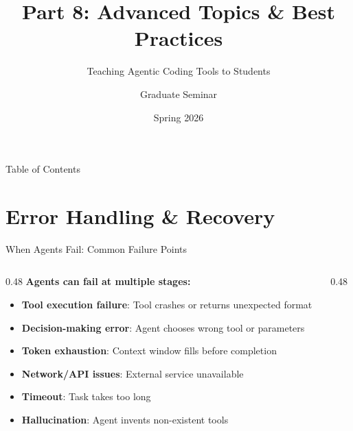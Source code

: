 \documentclass[aspectratio=169,11pt]{beamer}
\title[Part 8: Advanced Topics]{Part 8: Advanced Topics \& Best Practices}
\subtitle{Teaching Agentic Coding Tools to Students}
\author{Graduate Seminar}
\institute{University of South Carolina}
\date{Spring 2026}
\begin{document}
\begin{frame}[plain]
    \titlepage
\end{frame}

\begin{frame}{Table of Contents}
    \tableofcontents
\end{frame}

\section{Error Handling \& Recovery}

\begin{frame}{When Agents Fail: Common Failure Points}
    \begin{columns}[T]
        \begin{column}{0.48\textwidth}
            \textbf{Agents can fail at multiple stages:}
            \begin{itemize}
                \item \textbf{Tool execution failure}: Tool crashes or returns unexpected format
                \item \textbf{Decision-making error}: Agent chooses wrong tool or parameters
                \item \textbf{Token exhaustion}: Context window fills before completion
                \item \textbf{Network/API issues}: External service unavailable
                \item \textbf{Timeout}: Task takes too long
                \item \textbf{Hallucination}: Agent invents non-existent tools
            \end{itemize}
        \end{column}
        \begin{column}{0.48\textwidth}
            \centering
\end{column}
\end{columns}
\end{frame}
\end{document}
